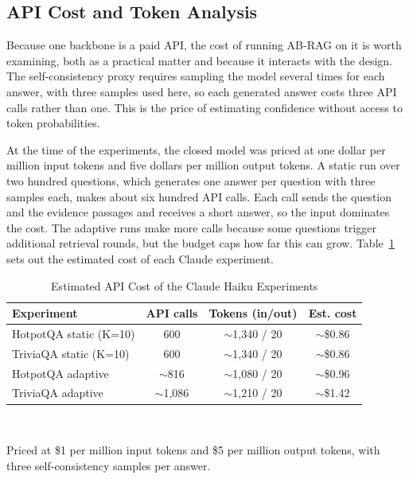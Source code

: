 \documentclass[conference,a4paper,10pt]{IEEEtran}
\begin{document}
\subsection{API Cost and Token Analysis}
Because one backbone is a paid API, the cost of running AB-RAG on it is worth examining,
both as a practical matter and because it interacts with the design. The self-consistency
proxy requires sampling the model several times for each answer, with three samples used
here, so each generated answer costs three API calls rather than one. This is the price of
estimating confidence without access to token probabilities.

At the time of the experiments, the closed model was priced at one dollar per million
input tokens and five dollars per million output tokens. A static run over two hundred
questions, which generates one answer per question with three samples each, makes about
six hundred API calls. Each call sends the question and the evidence passages and receives
a short answer, so the input dominates the cost. The adaptive runs make more calls because
some questions trigger additional retrieval rounds, but the budget caps how far this can
grow. Table~\ref{tab:cost} sets out the estimated cost of each Claude experiment.

\begin{table}[t]
\centering
\caption{Estimated API Cost of the Claude Haiku Experiments}
\label{tab:cost}
\renewcommand{\arraystretch}{1.2}
\begin{tabular}{lccc}
\toprule
\textbf{Experiment} & \textbf{API calls} & \textbf{Tokens (in/out)} & \textbf{Est. cost} \\
\midrule
HotpotQA static (K=10) & 600 & $\sim$1{,}340 / 20 & $\sim$\$0.86 \\
TriviaQA static (K=10) & 600 & $\sim$1{,}340 / 20 & $\sim$\$0.86 \\
HotpotQA adaptive & $\sim$816 & $\sim$1{,}080 / 20 & $\sim$\$0.96 \\
TriviaQA adaptive & $\sim$1{,}086 & $\sim$1{,}210 / 20 & $\sim$\$1.42 \\
\bottomrule
\end{tabular}
\\[2pt]
\begin{minipage}{\columnwidth}
\footnotesize Priced at \$1 per million input tokens and \$5 per million output tokens,
with three self-consistency samples per answer.
\end{minipage}
\end{table}
\end{document}
